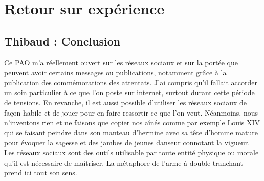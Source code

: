 \section{Retour sur expérience}
\subsection{Thibaud : Conclusion}

Ce PAO m'a réellement ouvert sur les réseaux sociaux et sur la portée que peuvent avoir certains messages ou publications, notamment grâce à la publication des commémorations des attentats. J'ai compris qu'il fallait accorder un soin particulier à ce que l'on poste sur internet, surtout durant cette période de tensions. En revanche, il est aussi possible d'utiliser les réseaux sociaux de façon habile et de jouer pour en faire ressortir ce que l'on veut.
Néanmoins, nous n'inventons rien et ne faisons que copier nos aînés comme par exemple Louis XIV qui se faisant peindre dans son manteau d'hermine avec sa tête d'homme mature pour évoquer la sagesse et des jambes de jeunes danseur connotant la vigueur.
Les réseaux sociaux sont des outils utilisable par toute entité physique ou morale qu'il est nécessaire de maîtriser. La métaphore de l'arme à double tranchant prend ici tout son sens.